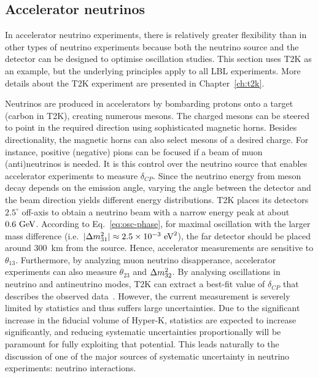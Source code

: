 \subsection{Accelerator neutrinos}
In accelerator neutrino experiments, there is relatively greater flexibility than in other types of neutrino experiments because both the neutrino source and the detector can be designed to optimise oscillation studies.
This section uses T2K as an example, but the underlying principles apply to all LBL experiments.
More details about the T2K experiment are presented in Chapter~\ref{ch:t2k}.

Neutrinos are produced in accelerators by bombarding protons onto a target (carbon in T2K), creating numerous mesons.
The charged mesons can be steered to point in the required direction using sophisticated magnetic horns.
Besides directionality, the magnetic horns can also select mesons of a desired charge.
For instance, positive (negative) pions can be focused if a beam of muon (anti)neutrinos is needed.
It is this control over the neutrino source that enables accelerator experiments to measure $\delta_{CP}$.
Since the neutrino energy from meson decay depends on the emission angle, varying the angle between the detector and the beam direction yields different energy distributions.
T2K places its detectors $2.5^\circ$ off-axis to obtain a neutrino beam with a narrow energy peak at about $0.6~\textrm{GeV}$.
According to Eq.~\ref{eq:osc-phase}, for maximal oscillation with the larger mass difference (i.e.\ $|\Delta m^2_{31}| \approx 2.5 \times 10^{-3}~\textrm{eV}^2$), the far detector should be placed around $300$~km from the source.
Hence, accelerator measurements are sensitive to $\theta_{13}$.
Furthermore, by analyzing muon neutrino disapperance, accelerator experiments can also measure $\theta_{23}$ and $\Delta m^2_{32}$.
By analysing oscillations in neutrino and antineutrino modes, T2K can extract a best-fit value of $\delta_{CP}$ that describes the observed data~\cite{T2K:2019bcf}.
However, the current measurement is severely limited by statistics and thus suffers large uncertainties.
Due to the significant increase in the fiducial volume of Hyper-K, statistics are expected to increase significantly, and reducing systematic uncertainties proportionally will be paramount for fully exploiting that potential.
This leads naturally to the discussion of one of the major sources of systematic uncertainty in neutrino experiments: neutrino interactions.

